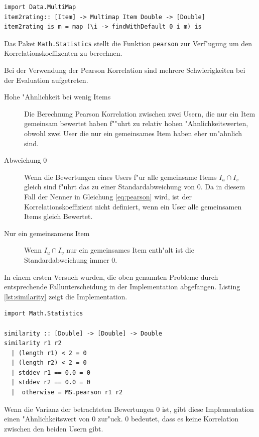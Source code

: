 \documentclass[a4paper, 12pt]{article}
\begin{document}
\begin{lstlisting}[caption=Implementation: Abbildung Items zu Bewertungen, label=lst:item2rating]
import Data.MultiMap
item2rating:: [Item] -> Multimap Item Double -> [Double]
item2rating is m = map (\i -> findWithDefault 0 i m) is
\end{lstlisting}

Das Paket \verb|Math.Statistics| stellt die Funktion \verb|pearson| zur Verf"ugung um den Korrelationskoeffizenten zu berechnen.

Bei der Verwendung der Pearson Korrelation sind mehrere Schwierigkeiten bei der Evaluation aufgetreten.

\begin{description}
\item[Hohe "Ahnlichkeit bei wenig Items] Die Berechnung Pearson Korrelation zwischen zwei Usern, die nur ein Item gemeinsam bewertet haben f""uhrt zu relativ hohen "Ahnlichkeitswerten, obwohl zwei User die nur ein gemeinsames Item haben eher un"ahnlich sind.
\item[Abweichung 0] Wenn die Bewertungen eines Users f"ur alle gemeinsame Items  $I_u \cap I_v$ gleich sind f"uhrt das zu einer Standardabweichung von 0. Da in diesem Fall der Nenner in Gleichung \ref{eq:pearson} wird, ist der Korrelationskoeffizient nicht definiert, wenn ein User alle gemeinsamen Items gleich Bewertet.
\item[Nur ein gemeinsamens Item] Wenn  $I_u \cap I_v$ nur ein gemeinsames Item enth"alt ist die Standardabweichung immer 0.
\end{description}

In einem ersten Versuch wurden, die oben genannten Probleme durch entsprechende Fallunterscheidung in der Implementation abgefangen. Listing \ref{lst:similarity} zeigt die Implementation.

\begin{lstlisting}[caption=Similarity, label=lst:similarity]
import Math.Statistics

similarity :: [Double] -> [Double] -> Double
similarity r1 r2
  | (length r1) < 2 = 0
  | (length r2) < 2 = 0
  | stddev r1 == 0.0 = 0
  | stddev r2 == 0.0 = 0
  |  otherwise = MS.pearson r1 r2

\end{lstlisting}

Wenn die Varianz der betrachteten Bewertungen 0 ist, gibt diese Implementation einen "Ahnlichkeitswert von 0 zur"uck. 0 bedeutet, dass es keine Korrelation zwischen den beiden Usern gibt.
\end{document}

